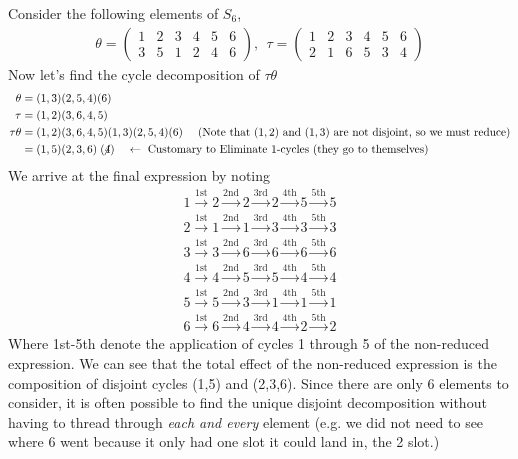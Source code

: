 \begin{example}
Consider the following elements of $S_6$,
\begin{align}
    \theta= \begin{pmatrix}
    1&2&3&4&5&6 \\ 3&5&1&2&4&6
    \end{pmatrix}, \ \ \tau = \begin{pmatrix}
    1&2&3&4&5&6 \\ 2&1&6&5&3&4
    \end{pmatrix} \nonumber
\end{align}
Now let's find the cycle decomposition of $\tau \theta$
\begin{align}
    \theta &= (1,3)(2,5,4)(6)\nonumber \\
    \tau &= (1,2)(3,6,4,5) \nonumber \\
    \tau\theta &= (1,2)(3,6,4,5)(1,3)(2,5,4)(6) \ \ \ \ (\text{Note that }(1,2) \text{ and } (1,3) \text{ are not disjoint, so we must reduce)} \nonumber \\
    &=(1,5)(2,3,6)\centernot{{(4)}} \ \ \ \ \leftarrow \text{ Customary to Eliminate 1-cycles (they go to themselves)} \nonumber
\end{align}
We arrive at the final expression by noting
\begin{align}
    1 \overset{\text{1st}}{\rightarrow} 2 \overset{\text{2nd}}{\rightarrow} 2 \overset{\text{3rd}}{\rightarrow}2 \overset{\text{4th}}{\rightarrow}5 \overset{\text{5th}}{\rightarrow} 5 \nonumber \\
    2 \overset{\text{1st}}{\rightarrow} 1 \overset{\text{2nd}}{\rightarrow} 1 \overset{\text{3rd}}{\rightarrow}3 \overset{\text{4th}}{\rightarrow}3 \overset{\text{5th}}{\rightarrow}3 \nonumber \\
    3 \overset{\text{1st}}{\rightarrow} 3 \overset{\text{2nd}}{\rightarrow} 6 \overset{\text{3rd}}{\rightarrow}6 \overset{\text{4th}}{\rightarrow}6 \overset{\text{5th}}{\rightarrow}6 \nonumber \\
    4 \overset{\text{1st}}{\rightarrow} 4 \overset{\text{2nd}}{\rightarrow} 5 \overset{\text{3rd}}{\rightarrow}5 \overset{\text{4th}}{\rightarrow}4 \overset{\text{5th}}{\rightarrow}4 \nonumber \\
    5 \overset{\text{1st}}{\rightarrow} 5 \overset{\text{2nd}}{\rightarrow} 3 \overset{\text{3rd}}{\rightarrow}1 \overset{\text{4th}}{\rightarrow}1 \overset{\text{5th}}{\rightarrow}1 \nonumber \\
    6 \overset{\text{1st}}{\rightarrow} 6 \overset{\text{2nd}}{\rightarrow} 4 \overset{\text{3rd}}{\rightarrow}4 \overset{\text{4th}}{\rightarrow}2 \overset{\text{5th}}{\rightarrow}2 \nonumber
\end{align}
Where 1st-5th denote the application of cycles 1 through 5 of the non-reduced expression. We can see that the total effect of the non-reduced expression is the composition of disjoint cycles (1,5) and (2,3,6). Since there are only 6 elements to consider, it is often possible to find the unique disjoint decomposition without having to thread through \textit{each and every} element (e.g. we did not need to see where 6 went because it only had one slot it could land in, the 2 slot.)
\end{example}

